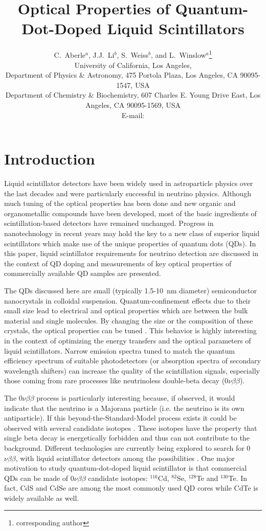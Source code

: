 \documentclass[cits]{JINST}
\title{Optical Properties of Quantum-Dot-Doped Liquid Scintillators}
\author{C.~Aberle$^a$, J.J.~Li$^b$, S.~Weiss$^b$, and L.~Winslow$^a$\setcounter{footnote}{0}\thanks{corresponding author}\\
University of California, Los Angeles,\\
\llap{$^a$}Department of Physics \& Astronomy, 475 Portola Plaza, Los Angeles, CA 90095-1547, USA\\
\llap{$^b$}Department of Chemistry \& Biochemistry, 607 Charles E. Young Drive East, Los Angeles, CA 90095-1569, USA\\
  E-mail: \email{lwinslow@physics.ucla.edu}}
\begin{document}
\section{Introduction}\label{intro}
Liquid scintillator detectors have been widely used in astroparticle physics over the last decades and were particularly successful in neutrino physics. Although much tuning of the optical properties has been done and new organic and organometallic compounds have been developed, most of the basic ingredients of scintillation-based detectors have remained unchanged. Progress in nanotechnology in recent years may hold the key to a new class of superior liquid scintillators which make use of the unique properties of quantum dots (QDs). In this paper, liquid scintillator requirements for neutrino detection are discussed in the context of QD doping and measurements of key optical properties of commercially available QD samples are presented. 

The QDs discussed here are small (typically 1.5-10~nm diameter) semiconductor nanocrystals in colloidal suspension. Quantum-confinement effects due to their small size lead to electrical and optical properties which are between the bulk material and single molecules. By changing the size or the composition of these crystals, the optical properties can be tuned \cite{alivisatos1996,swafford2006}. This behavior is highly interesting in the context of optimizing the energy transfers and the optical parameters of liquid scintillators. Narrow emission spectra tuned to match the quantum efficiency spectrum of suitable photodetectors (or absorption spectra of secondary wavelength shifters) can increase the quality of the scintillation signals, especially those coming from rare processes like neutrinoless double-beta decay (0$\nu\beta\beta$). 

The 0$\nu\beta\beta$ process is particularly interesting because, if observed, it would indicate that the neutrino is a Majorana particle (i.e. the neutrino is its own antiparticle). If this beyond-the-Standard-Model process exists it could be observed with several candidate isotopes \cite{vogel2002}. These isotopes have the property that single beta decay is energetically forbidden and thus can not contribute to the background. Different technologies are currently being explored to search for 0$\nu\beta\beta$, with liquid scintillator detectors among the possibilities \cite{kamlandzen,snoplus}. One major motivation to study quantum-dot-doped liquid scintillator is that commercial QDs can be made of 0$\nu\beta\beta$ candidate isotopes: $^{116}$Cd, $^{82}$Se, $^{128}$Te and $^{130}$Te. In fact, CdS and CdSe are among the most commonly used QD cores while CdTe is widely available as well.
\end{document}
